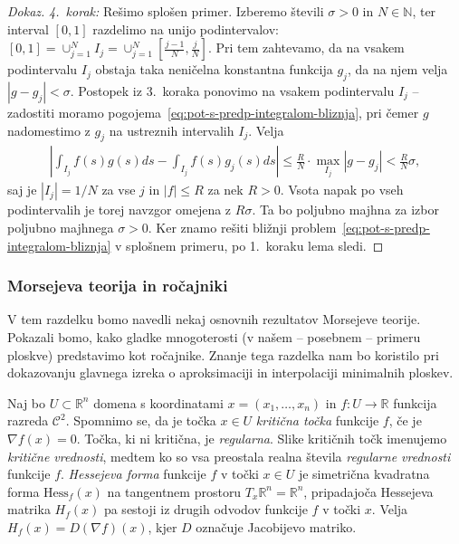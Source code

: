 \documentclass[12pt,a4paper,twoside]{article}
\theoremstyle{definition} %
\newenvironment{dokaz}[1][Dokaz]{\begin{proof}[#1]}{\end{proof}}
\theoremstyle{plain} %
\numberwithin{equation}{section}  %
\newcommand{\R}{\mathbb R}
\begin{document}
\begin{dokaz}
\textit{4.~korak:} Rešimo splošen primer. \newline
Izberemo števili $\sigma > 0$ in $N \in \mathbb{N}$, ter interval $[0,1]$ razdelimo na unijo podintervalov: $[0,1] = \cup_{j=1}^{N} I_{j} = \cup_{j=1}^{N} [\frac{j-1}{N}, \frac{j}{N}]$. Pri tem zahtevamo, da na vsakem podintervalu $I_{j}$ obstaja taka neničelna konstantna funkcija $g_{j}$, da na njem velja $|g - g_{j}| < \sigma$.
Postopek iz 3.~koraka ponovimo na vsakem podintervalu $I_{j}$ -- zadostiti moramo pogojema~\eqref{eq:pot-s-predp-integralom-bliznja}, pri čemer $g$ nadomestimo z $g_{j}$ na ustreznih intervalih $I_{j}$.
Velja
\begin{gather*}
\left| \int_{I_{j}} f(s)g(s)ds - \int_{I_{j}} f(s)g_{j}(s)ds \right| \leq \frac{R}{N} \cdot \max_{I_{j}} |g - g_{j}| < \frac{R}{N} \sigma,
\end{gather*}
saj je $|I_{j}| = 1/N$ za vse $j$ in $|f| \leq R$ za nek $R > 0$.
Vsota napak po vseh podintervalih je torej navzgor omejena z $R \sigma$. Ta bo poljubno majhna za izbor poljubno majhnega $\sigma >0$.
Ker znamo rešiti bližnji problem~\eqref{eq:pot-s-predp-integralom-bliznja} v splošnem primeru, po 1.~koraku lema sledi.
\end{dokaz}

\subsubsection{Morsejeva teorija in ročajniki}
%
V tem razdelku bomo navedli nekaj osnovnih rezultatov Morsejeve teorije. Pokazali bomo, kako gladke mnogoterosti (v našem -- posebnem -- primeru ploskve) predstavimo kot ročajnike. Znanje tega razdelka nam bo koristilo pri dokazovanju glavnega izreka o aproksimaciji in interpolaciji minimalnih ploskev.
   
Naj bo $U \subset \mathbb{R}^{n}$ domena s koordinatami $x = (x_{1}, \dots , x_{n})$ in $f \colon U \to \mathbb{R}$ funkcija razreda $\mathcal{C}^{2}$.
Spomnimo se, da je točka $x \in U$ \emph{kritična točka} funkcije $f$, če je $\nabla f(x) = 0$. Točka, ki ni kritična, je \emph{regularna}.
Slike kritičnih točk imenujemo \emph{kritične vrednosti}, medtem ko so vsa preostala realna števila \emph{regularne vrednosti} funkcije $f$. \newline
%
\emph{Hessejeva forma} funkcije $f$ v točki $x \in U$ je simetrična kvadratna forma $\text{Hess}_{f}(x)$ na tangentnem prostoru $T_{x}\R^{n} = \R^{n}$, pripadajoča Hessejeva matrika $H_{f}(x)$ pa sestoji iz drugih odvodov funkcije $f$ v točki $x$. Velja $H_{f}(x) = D(\nabla f)(x)$, kjer $D$ označuje Jacobijevo matriko.
\end{document}
